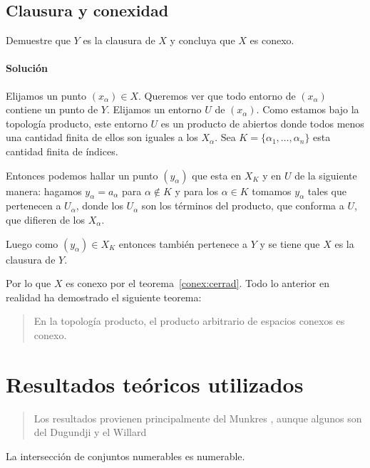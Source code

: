 \documentclass[a5paper,10pt,final]{extarticle}
\begin{document}
\subsection{Clausura y conexidad}

Demuestre que $Y$ es la clausura de $X$ y concluya que $X$ es conexo.

\paragraph{Solución}
Elijamos un punto $(x_\alpha)\in X$. Queremos ver que todo entorno de $(x_\alpha)$ contiene
un punto de $Y$. Elijamos un entorno $U$ de $(x_\alpha)$. Como estamos bajo
la topología producto, este entorno $U$ es un producto de abiertos donde todos
menos una cantidad finita de ellos son iguales a los $X_\alpha$. Sea
$K=\{\alpha_1,\dots,\alpha_n\}$ esta cantidad finita de índices.

Entonces podemos hallar un punto $(y_\alpha)$ que esta en $X_K$ y  en $U$ de la siguiente manera:
hagamos $y_\alpha=a_\alpha$ para $\alpha\notin K$ y para los $\alpha\in K$ tomamos $y_\alpha$
tales que pertenecen a $U_\alpha$, donde los $U_\alpha$ son los términos
del producto, que conforma a $U$, que difieren de los $X_\alpha$.

Luego como $(y_\alpha)\in X_K$ entonces también pertenece a $Y$ y se tiene
que $X$ es la clausura de $Y$.

Por lo que $X$ es conexo por el teorema~\ref{conex:cerrad}. Todo lo anterior en realidad ha demostrado
el siguiente teorema:
\begin{quote}
	En la topología producto, el producto arbitrario de espacios conexos es conexo.	
\end{quote}

\section{Resultados teóricos utilizados}

\begin{quote}
	\small Los resultados provienen principalmente del Munkres \cite{munkres_topology_2014},
	aunque algunos son del Dugundji \cite{dugundji_topology_1987} y el Willard %
\end{quote}

\begin{teo}\label{teo:interConNum}
	La intersección de conjuntos numerables es numerable.
\end{teo}
\end{document}
